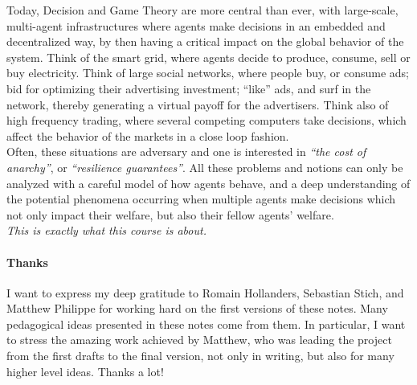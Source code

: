 Today, Decision and Game Theory are more central than ever, with large-scale, multi-agent infrastructures where agents make decisions in an embedded and decentralized way, by then having a critical impact on the global behavior of the system.  Think of the smart grid, where agents decide to produce, consume, sell or buy electricity.  Think of large social networks, where people buy, or consume ads; bid for optimizing their advertising investment; ``like'' ads, and surf in the network, thereby generating a virtual payoff for the advertisers.  Think also of high frequency trading, where several competing computers take decisions, which affect the behavior of the markets in a close loop fashion.\\   Often, these situations are adversary and one is interested in \emph{``the cost of anarchy''}, or \emph{``resilience guarantees''}.  All these problems and notions can only be analyzed with a careful model of how agents behave, and a deep understanding of the potential phenomena occurring when multiple agents make decisions which not only impact their welfare, but also their fellow agents' welfare.  \\
\emph{This is exactly what this course is about.}


\paragraph{Thanks}
I want to express my deep gratitude to Romain Hollanders, Sebastian Stich, and Matthew Philippe for working hard on the first versions of these notes. Many pedagogical ideas presented in these notes come from them.  In particular, I want to stress the amazing work achieved by Matthew, who was leading the project from the first drafts to the final version, not only in writing, but also for many higher level ideas.  Thanks a lot!

\label{chap:intro}




\ifx \globalmark \undefined %


	
\else

\fi





